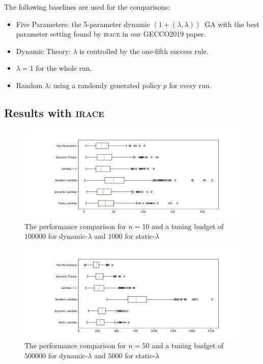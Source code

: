 \documentclass{article}
\newcommand{\opll}{$(1+(\lambda,\lambda))$~GA\xspace}
\newcommand{\irace}{\textsc{irace}\xspace}
\begin{document}
The following baselines are used for the comparisons:
\begin{itemize}
    \item Five Parameters: the 5-parameter dynamic \opll with the best parameter setting found by \irace in our GECCO2019 paper.
    \item Dynamic Theory: $\lambda$ is controlled by the one-fifth success rule.
    \item $\lambda=1$ for the whole run.
    \item Random $\lambda$: using a randomly generated policy $p$ for every run.
\end{itemize}

\subsection{Results with \irace}

\begin{figure}[ht]
    \centering
        \includegraphics[width=1.0\textwidth]{box_plot_10_100_10000.pdf}
        \caption{The performance comparison for $n = 10$ and a tuning budget of $100000$ for dynamic-$\lambda$ and $1000$ for static-$\lambda$}
        \label{box_plot_10_100_10000}
\end{figure}

\begin{figure}[ht]
    \centering
        \includegraphics[width=1.0\textwidth]{box_plot_50_100_10000.pdf}
        \caption{The performance comparison for $n = 50$ and a tuning budget of $500000$ for dynamic-$\lambda$ and $5000$ for static-$\lambda$}
        \label{box_plot_50_100_10000}
\end{figure}
\end{document}
